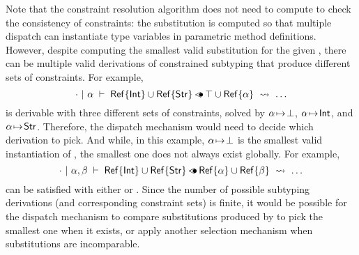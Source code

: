 Note that the constraint resolution algorithm does not need to compute
\substvars to check the consistency of constraints: the substitution 
is computed so that multiple dispatch can instantiate type variables
in parametric method definitions. However, despite \solvectrdflt
computing the smallest valid substitution for the given \CSet, 
there can be multiple valid
derivations of constrained subtyping that produce different
sets of constraints.
For example,
\[
    \cdot~\vert~\alpha\;\vdash\;\mathsf{Ref}\{\mathsf{Int}\} \cup \mathsf{Ref}\{\mathsf{Str}\} \operatorname{\lessdot\!\!\bullet} \top \cup \mathsf{Ref}\{\alpha\}\ \rightsquigarrow\ \ldots
\]
is derivable with three different sets of constraints, solved by 
$\alpha\!\mapsto\!\bot$, $\alpha\!\mapsto\!\mathsf{Int}$, and
$\alpha\!\mapsto\!\mathsf{Str}$. %
Therefore, the dispatch mechanism would need to decide which derivation to pick.
And while, in this example, $\alpha\!\mapsto\!\bot$ is the smallest valid
instantiation of \va, the smallest one does not always exist globally.
For example,
\[
    \cdot~\vert~\alpha,\beta\;\vdash\;\mathsf{Ref}\{\mathsf{Int}\} \cup \mathsf{Ref}\{\mathsf{Str}\} \operatorname{\lessdot\!\!\bullet} \mathsf{Ref}\{\alpha\} \cup \mathsf{Ref}\{\beta\}\ \rightsquigarrow\ \ldots
\]
can be satisfied with either
\subst{}{\substel{\va}{\tyint}, \substel{\vb}{\tystr\!}\!} or
\subst{}{\substel{\va}{\tystr}, \substel{\vb}{\tyint\!}\!}.
Since the number of possible subtyping derivations (and corresponding
constraint sets) is finite, it would be possible for the dispatch mechanism
to compare substitutions produced by \solvectrdflt to pick the smallest one
when it exists, or apply another selection mechanism when substitutions are 
incomparable.

